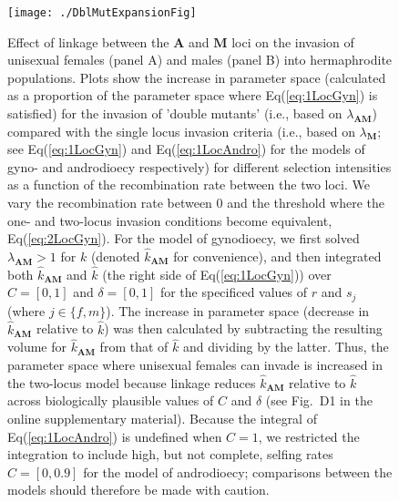 \documentclass{article}
\begin{document}
\begin{figure}[htbp]
\centering
\texttt{[image: ./DblMutExpansionFig]}
\caption{Effect of linkage between the $\mathbf{A}$ and $\mathbf{M}$ loci on the invasion of unisexual females (panel A) and males (panel B) into hermaphrodite populations. Plots show the increase in parameter space (calculated as a proportion of the parameter space where Eq(\ref{eq:1LocGyn}) is satisfied) for the invasion of 'double mutants' (i.e., based on $\lambda_{\mathbf{AM}}$) compared with the single locus invasion criteria (i.e., based on $\lambda_{\mathbf{M}}$; see Eq(\ref{eq:1LocGyn}) and Eq(\ref{eq:1LocAndro}) for the models of gyno- and androdioecy respectively) for different selection intensities as a function of the recombination rate between the two loci. We vary the recombination rate between $0$ and the threshold where the one- and two-locus invasion conditions become equivalent, Eq(\ref{eq:2LocGyn}). For the model of gynodioecy, we first solved $\lambda_{\mathbf{AM}} > 1$ for $k$ (denoted $\hat{k}_{\mathbf{AM}}$ for convenience), and then integrated both $\hat{k}_{\mathbf{AM}}$ and $\hat{k}$ (the right side of Eq(\ref{eq:1LocGyn})) over $C = [0,1]$ and $\delta = [0,1]$ for the specificed values of $r$ and $s_j$ (where $j \in \{f,m\}$). The increase in parameter space (decrease in $\hat{k}_{\mathbf{AM}}$ relative to $\hat{k}$) was then calculated by subtracting the resulting volume for $\hat{k}_{\mathbf{AM}}$ from that of $\hat{k}$ and dividing by the latter. Thus, the parameter space where unisexual females can invade is increased in the two-locus model because linkage reduces $\hat{k}_{\mathbf{AM}}$ relative to $\hat{k}$ across biologically plausible values of $C$ and $\delta$ (see Fig.~D1 in the online supplementary material). Because the integral of Eq(\ref{eq:1LocAndro}) is undefined when $C = 1$, we restricted the integration to include high, but not complete, selfing rates $C = [0, 0.9]$ for the model of androdioecy; comparisons between the models should therefore be made with caution.}
\label{fig:dblMutExpFig}
\end{figure}
\newpage{}
\end{document}
